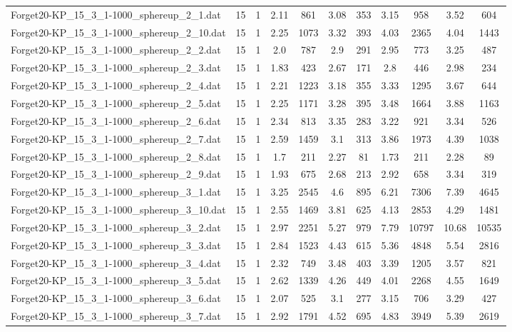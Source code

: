 \begin{table}[!ht]
\begin{tabular}{lcccccccccc}
Forget20-KP\_15\_3\_1-1000\_sphereup\_2\_1.dat & 15 & 1 & 2.11 & 861 & 3.08 & 353 & 3.15 & 958 & 3.52 & 604 \\
Forget20-KP\_15\_3\_1-1000\_sphereup\_2\_10.dat & 15 & 1 & 2.25 & 1073 & 3.32 & 393 & 4.03 & 2365 & 4.04 & 1443 \\
Forget20-KP\_15\_3\_1-1000\_sphereup\_2\_2.dat & 15 & 1 & 2.0 & 787 & 2.9 & 291 & 2.95 & 773 & 3.25 & 487 \\
Forget20-KP\_15\_3\_1-1000\_sphereup\_2\_3.dat & 15 & 1 & 1.83 & 423 & 2.67 & 171 & 2.8 & 446 & 2.98 & 234 \\
Forget20-KP\_15\_3\_1-1000\_sphereup\_2\_4.dat & 15 & 1 & 2.21 & 1223 & 3.18 & 355 & 3.33 & 1295 & 3.67 & 644 \\
Forget20-KP\_15\_3\_1-1000\_sphereup\_2\_5.dat & 15 & 1 & 2.25 & 1171 & 3.28 & 395 & 3.48 & 1664 & 3.88 & 1163 \\
Forget20-KP\_15\_3\_1-1000\_sphereup\_2\_6.dat & 15 & 1 & 2.34 & 813 & 3.35 & 283 & 3.22 & 921 & 3.34 & 526 \\
Forget20-KP\_15\_3\_1-1000\_sphereup\_2\_7.dat & 15 & 1 & 2.59 & 1459 & 3.1 & 313 & 3.86 & 1973 & 4.39 & 1038 \\
Forget20-KP\_15\_3\_1-1000\_sphereup\_2\_8.dat & 15 & 1 & 1.7 & 211 & 2.27 & 81 & 1.73 & 211 & 2.28 & 89 \\
Forget20-KP\_15\_3\_1-1000\_sphereup\_2\_9.dat & 15 & 1 & 1.93 & 675 & 2.68 & 213 & 2.92 & 658 & 3.34 & 319 \\
Forget20-KP\_15\_3\_1-1000\_sphereup\_3\_1.dat & 15 & 1 & 3.25 & 2545 & 4.6 & 895 & 6.21 & 7306 & 7.39 & 4645 \\
Forget20-KP\_15\_3\_1-1000\_sphereup\_3\_10.dat & 15 & 1 & 2.55 & 1469 & 3.81 & 625 & 4.13 & 2853 & 4.29 & 1481 \\
Forget20-KP\_15\_3\_1-1000\_sphereup\_3\_2.dat & 15 & 1 & 2.97 & 2251 & 5.27 & 979 & 7.79 & 10797 & 10.68 & 10535 \\
Forget20-KP\_15\_3\_1-1000\_sphereup\_3\_3.dat & 15 & 1 & 2.84 & 1523 & 4.43 & 615 & 5.36 & 4848 & 5.54 & 2816 \\
Forget20-KP\_15\_3\_1-1000\_sphereup\_3\_4.dat & 15 & 1 & 2.32 & 749 & 3.48 & 403 & 3.39 & 1205 & 3.57 & 821 \\
Forget20-KP\_15\_3\_1-1000\_sphereup\_3\_5.dat & 15 & 1 & 2.62 & 1339 & 4.26 & 449 & 4.01 & 2268 & 4.55 & 1649 \\
Forget20-KP\_15\_3\_1-1000\_sphereup\_3\_6.dat & 15 & 1 & 2.07 & 525 & 3.1 & 277 & 3.15 & 706 & 3.29 & 427 \\
Forget20-KP\_15\_3\_1-1000\_sphereup\_3\_7.dat & 15 & 1 & 2.92 & 1791 & 4.52 & 695 & 4.83 & 3949 & 5.39 & 2619 \\

\end{tabular}
\end{table}
